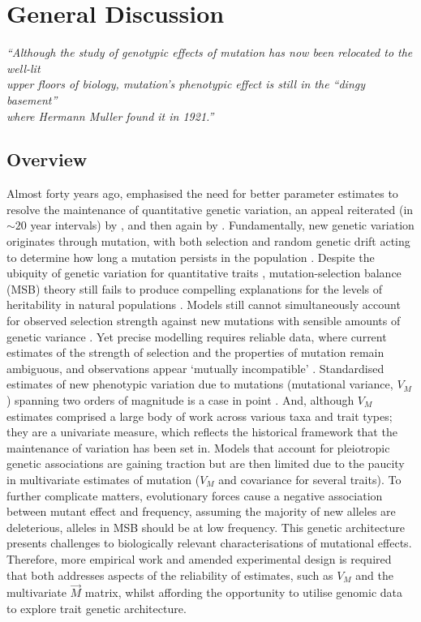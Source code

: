 \chapter{General Discussion}
\begin{center}
    \textit{“Although the study of genotypic effects of mutation has now been relocated to the well-lit \\ upper floors of biology, mutation’s phenotypic effect is still in  the “dingy basement” \\ where Hermann Muller found it in 1921.”} \citet{Houl13}
\end{center}

\section{Overview}
Almost forty years ago, \citet{Ture84} emphasised the need for better parameter estimates to resolve the maintenance of quantitative genetic variation, an appeal reiterated (in $\sim20$ year intervals) by \citet{John05}, and then again by \citet{Wals18}. Fundamentally, new genetic variation originates through mutation, with both selection and random genetic drift acting to determine how long a mutation persists in the population \citep{Land75,Kond92, John05, Zhan05}. Despite the ubiquity of genetic variation for quantitative traits \citep{Lync98}, mutation-selection balance (MSB) theory still fails to produce compelling explanations for the levels of heritability in natural populations \citep{Wals18}. Models still cannot simultaneously account for observed selection strength against new mutations with sensible amounts of genetic variance \citep[thoroughly reviewed by][]{Wals18}. Yet precise modelling requires reliable data, where current estimates of the strength of selection and the properties of mutation remain ambiguous, and observations appear ‘mutually incompatible’ \citep{John05}. Standardised estimates of new phenotypic variation due to mutations (mutational variance, $V_M$) spanning two orders of magnitude is a case in point \citep{Houl96,Lync99,Hall09}. And, although $V_M$ estimates comprised a large body of work across various taxa and trait types; they are a univariate measure, which reflects the historical framework that the maintenance of variation has been set in. Models that account for pleiotropic genetic associations are gaining traction \citep{Bart90,John05} but are then limited due to the paucity in multivariate estimates of mutation ($V_M$ and covariance for several traits). To further complicate matters, evolutionary forces cause a negative association between mutant effect and frequency, assuming the majority of new alleles are deleterious, alleles in MSB should be at low frequency. This genetic architecture presents challenges to biologically relevant characterisations of mutational effects. Therefore, more empirical work and amended experimental design is required that both addresses aspects of the reliability of estimates, such as $V_M$ and the multivariate $\vec{M}$ matrix, whilst affording the opportunity to utilise genomic data to explore trait genetic architecture.\par

